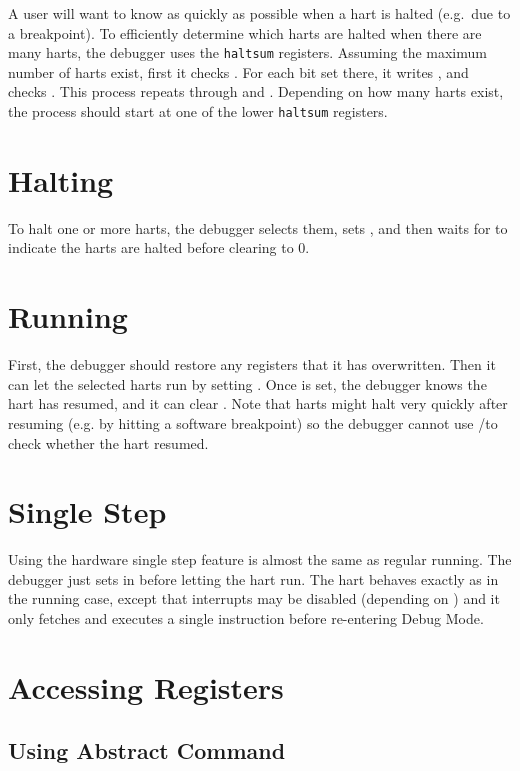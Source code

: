 A user will want to know as quickly as possible when a hart is halted (e.g.\ due
to a breakpoint).  To efficiently determine which harts are halted when there
are many harts, the debugger uses the {\tt haltsum} registers. Assuming the
maximum number of harts exist, first it checks \Rhaltsumthree. For each bit set
there, it writes \Fhartsel, and checks \Rhaltsumtwo. This process repeats
through \Rhaltsumone and \Rhaltsumzero. Depending on how many harts exist, the
process should start at one of the lower {\tt haltsum} registers.

\section{Halting} \label{deb:halt}

To halt one or more harts, the debugger selects them, sets \Fhaltreq, and then
waits for \Fallhalted to indicate the harts are halted before clearing
\Fhaltreq to 0.

\section{Running}

First, the debugger should restore any registers that it has overwritten.
Then it can let the selected harts run by setting \Fresumereq. Once
\Fallresumeack is set, the debugger knows the hart has resumed, and it can
clear \Fresumereq. Note that harts might halt very quickly after resuming (e.g.
by hitting a software breakpoint) so the debugger cannot use
\Fallhalted/\Fanyhalted to check whether the hart resumed.

\section{Single Step}

Using the hardware single step feature is almost the same as regular running.
The debugger just sets \Fstep in \Rdcsr before letting the hart run. The hart
behaves exactly as in the running case, except that interrupts may be disabled
(depending on \Fstepie) and it only fetches and executes a single instruction
before re-entering Debug Mode.

\section{Accessing Registers}

\subsection{Using Abstract Command} \label{deb:abstractreg}

